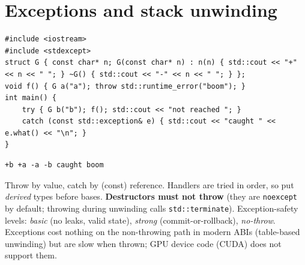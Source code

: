 \documentclass[10pt,a4paper,openany,oneside]{report}
\newcommand{\prio}[1]{\texorpdfstring{\ifcase#1\or{\color{gold}\ding{72}}\or{\color{gold}\ding{72}\ding{72}}\or{\color{gold}\ding{72}\ding{72}\ding{72}}\fi}{}}
\begin{document}
\section{Exceptions and stack unwinding \prio{2}}
\begin{lstlisting}[language={[11]C++},title={Destructors run during unwinding, in reverse order}]
#include <iostream>
#include <stdexcept>
struct G { const char* n; G(const char* n) : n(n) { std::cout << "+" << n << " "; } ~G() { std::cout << "-" << n << " "; } };
void f() { G a("a"); throw std::runtime_error("boom"); }
int main() {
    try { G b("b"); f(); std::cout << "not reached "; }
    catch (const std::exception& e) { std::cout << "caught " << e.what() << "\n"; }
}
\end{lstlisting}
\begin{lstlisting}[style=out,title={Answer: captured output}]
+b +a -a -b caught boom
\end{lstlisting}
\begin{mustbox}
Throw by value, catch by (const) reference. Handlers are tried in order, so put \emph{derived} types before bases. \textbf{Destructors must not throw} (they are \texttt{noexcept} by default; throwing during unwinding calls \texttt{std::terminate}). Exception-safety levels: \emph{basic} (no leaks, valid state), \emph{strong} (commit-or-rollback), \emph{no-throw}. Exceptions cost nothing on the non-throwing path in modern ABIs (table-based unwinding) but are slow when thrown; GPU device code (CUDA) does not support them.
\end{mustbox}
\end{document}
